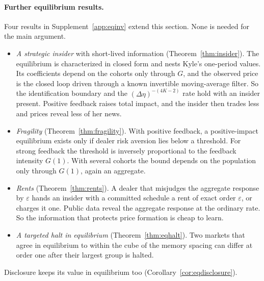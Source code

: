 
\paragraph{Further equilibrium results.} Four results in Supplement~\ref{app:eqinv} extend this section. None is needed for the main argument.
\begin{itemize}[itemsep=1pt,topsep=2pt]
\item \emph{A strategic insider} with short-lived information (Theorem~\ref{thm:insider}). The equilibrium is characterized in closed form and nests Kyle's one-period values. Its coefficients depend on the cohorts only through $G$, and the observed price is the closed loop driven through a known invertible moving-average filter. So the identification boundary and the $(\Delta\eta)^{-(4K-2)}$ rate hold with an insider present. Positive feedback raises total impact, and the insider then trades less and prices reveal less of her news.
\item \emph{Fragility} (Theorem~\ref{thm:fragility}). With positive feedback, a positive-impact equilibrium exists only if dealer risk aversion lies below a threshold. For strong feedback the threshold is inversely proportional to the feedback intensity $G(1)$. With several cohorts the bound depends on the population only through $G(1)$, again an aggregate.
\item \emph{Rents} (Theorem~\ref{thm:rents}). A dealer that misjudges the aggregate response by $\varepsilon$ hands an insider with a committed schedule a rent of exact order $\varepsilon$, or charges it one. Public data reveal the aggregate response at the ordinary rate. So the information that protects price formation is cheap to learn.
\item \emph{A targeted halt in equilibrium} (Theorem~\ref{thm:eqhalt}). Two markets that agree in equilibrium to within the cube of the memory spacing can differ at order one after their largest group is halted.
\end{itemize}
Disclosure keeps its value in equilibrium too (Corollary~\ref{cor:eqdisclosure}).
